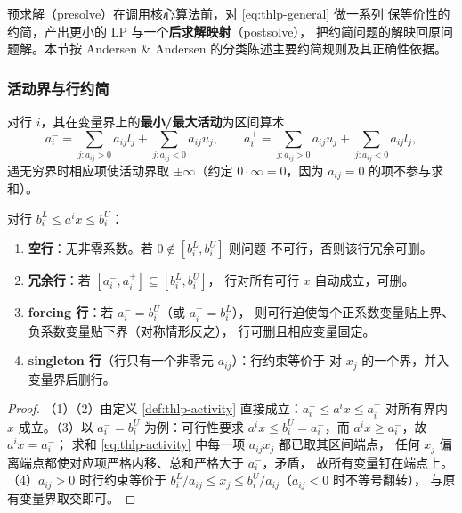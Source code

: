 预求解（presolve）在调用核心算法前，对 \eqref{eq:thlp-general} 做一系列
保等价性的约简，产出更小的 LP 与一个\textbf{后求解映射}（postsolve），
把约简问题的解映回原问题解。本节按 Andersen \& Andersen
\cite{lpandersen1995} 的分类陈述主要约简规则及其正确性依据。

\subsubsection{活动界与行约简}

\begin{definition}[行活动界]\label{def:thlp-activity}
对行 $i$，其在变量界上的\textbf{最小/最大活动}为区间算术
\begin{equation}\label{eq:thlp-activity}
  a_i^{-}=\sum_{j:a_{ij}>0}a_{ij}l_j+\sum_{j:a_{ij}<0}a_{ij}u_j,
  \qquad
  a_i^{+}=\sum_{j:a_{ij}>0}a_{ij}u_j+\sum_{j:a_{ij}<0}a_{ij}l_j ,
\end{equation}
遇无穷界时相应项使活动界取 $\pm\infty$（约定 $0\cdot\infty=0$，因为
$a_{ij}=0$ 的项不参与求和）。
\end{definition}

\begin{proposition}[行约简规则的正确性]\label{prop:thlp-rowrules}
对行 $b_i^{L}\le a^{i}x\le b_i^{U}$：
\begin{enumerate}
  \item \textbf{空行}：无非零系数。若 $0\notin[b_i^{L},b_i^{U}]$ 则问题
        不可行，否则该行冗余可删。
  \item \textbf{冗余行}：若 $[a_i^{-},a_i^{+}]\subseteq[b_i^{L},b_i^{U}]$，
        行对所有可行 $x$ 自动成立，可删。
  \item \textbf{forcing 行}：若 $a_i^{-}=b_i^{U}$（或 $a_i^{+}=b_i^{L}$），
        则可行迫使每个正系数变量贴上界、负系数变量贴下界（对称情形反之），
        行可删且相应变量固定。
  \item \textbf{singleton 行}（行只有一个非零元 $a_{ij}$）：行约束等价于
        对 $x_j$ 的一个界，并入变量界后删行。
\end{enumerate}
\end{proposition}

\begin{proof}
（1）（2）由定义 \ref{def:thlp-activity} 直接成立：$a_i^{-}\le a^{i}x\le a_i^{+}$
对所有界内 $x$ 成立。（3）以 $a_i^{-}=b_i^{U}$ 为例：可行性要求
$a^{i}x\le b_i^{U}=a_i^{-}$，而 $a^{i}x\ge a_i^{-}$，故 $a^{i}x=a_i^{-}$；
求和 \eqref{eq:thlp-activity} 中每一项 $a_{ij}x_j$ 都已取其区间端点，
任何 $x_j$ 偏离端点都使对应项严格内移、总和严格大于 $a_i^{-}$，矛盾，
故所有变量钉在端点上。（4）$a_{ij}>0$ 时行约束等价于
$b_i^{L}/a_{ij}\le x_j\le b_i^{U}/a_{ij}$（$a_{ij}<0$ 时不等号翻转），
与原有变量界取交即可。
\end{proof}


